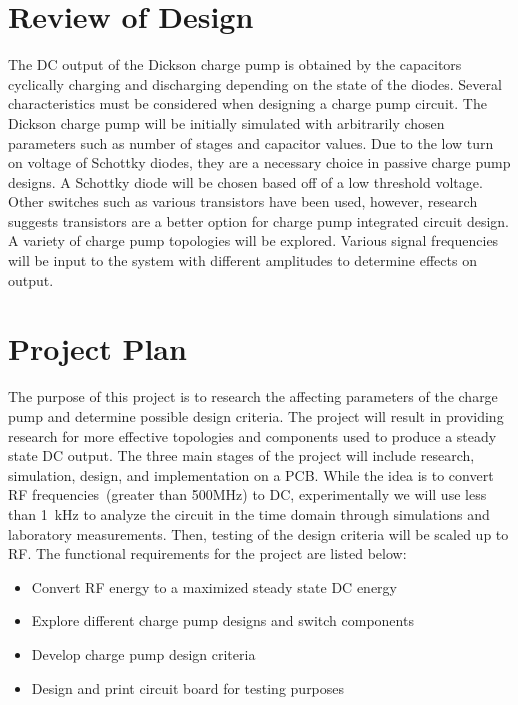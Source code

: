 \documentclass[12pt]{article}
\begin{document}
	\section{Review of Design}
	The DC output of the Dickson charge pump is obtained by the capacitors cyclically charging and discharging depending on the state of the diodes. Several characteristics must be considered when designing a charge pump circuit. The Dickson charge pump will be initially simulated with arbitrarily chosen parameters such as number of stages and capacitor values. Due to the low turn on voltage of Schottky diodes, they are a necessary choice in passive charge pump designs. A Schottky diode will be chosen based off of a low threshold voltage. Other switches such as various transistors have been used, however, research suggests transistors are a better option for charge pump integrated circuit design. A variety of charge pump topologies will be explored. Various signal frequencies will be input to the system with different amplitudes to determine effects on output.

	\section{Project Plan}
	The purpose of this project is to research the affecting parameters of the charge pump and determine possible design criteria. The project will result in providing research for more effective topologies and components used to produce a steady state DC output. The three main stages of the project will include research, simulation, design, and implementation on a PCB. While the idea is to convert RF frequencies~(greater than 500MHz) to DC, experimentally we will use less than 1~kHz to analyze the circuit in the time domain through simulations and laboratory measurements. Then, testing of the design criteria will be scaled up to RF. The functional requirements for the project are listed below:\\
	
\begin{itemize}
	\item Convert RF energy to a maximized steady state DC energy
	\item Explore different charge pump designs and switch components
	\item Develop charge pump design criteria
	\item Design and print circuit board for testing purposes
\end{itemize}
	
\end{document}

